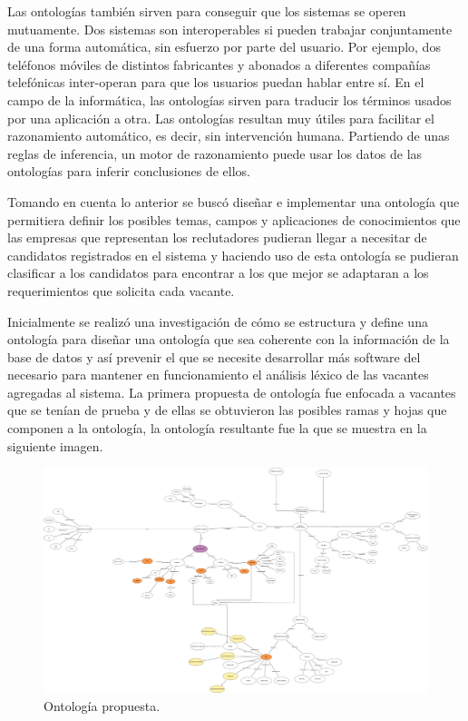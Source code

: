 Las  ontologías  también  sirven  para  conseguir  que  los sistemas se operen  mutuamente.  Dos  sistemas  son  interoperables  si  pueden  trabajar  conjuntamente  de  una  forma automática, sin esfuerzo por parte del usuario. Por ejemplo, dos teléfonos móviles de distintos fabricantes y abonados a diferentes  compañías  telefónicas  inter-operan  para  que  los usuarios   puedan   hablar   entre   sí.   En   el   campo   de   la informática, las ontologías sirven para traducir los términos usados  por  una  aplicación  a  otra. Las ontologías resultan muy útiles para facilitar el razonamiento automático, es decir, sin intervención humana. Partiendo de unas reglas  de  inferencia,  un  motor  de  razonamiento  puede  usar  los datos  de  las  ontologías  para  inferir  conclusiones  de  ellos.  \\
\newline

Tomando en cuenta lo anterior se buscó diseñar e implementar una ontología que permitiera definir los posibles temas, campos y aplicaciones de conocimientos que las empresas que representan los reclutadores pudieran llegar a necesitar de candidatos registrados en el sistema y haciendo uso de esta ontología se pudieran clasificar a los candidatos para encontrar a los que mejor se adaptaran a los requerimientos que solicita cada vacante. \\
\newline

Inicialmente se realizó una investigación de cómo se estructura y define una ontología para diseñar una ontología que sea coherente con la información de la base de datos y así prevenir el que se necesite desarrollar más software del necesario para mantener en funcionamiento el análisis léxico de las vacantes agregadas al sistema. La primera propuesta de ontología fue enfocada a vacantes que se tenían de prueba y de ellas se obtuvieron las posibles ramas y hojas que componen a la ontología, la ontología resultante fue la que se muestra en la siguiente imagen.

\begin{figure}[H]
    \begin{center}
        \includegraphics[width=.8\textwidth]{desarrollo/imagenes/Ontologia.png}
    \end{center}
    \caption{Ontología propuesta.}
    \label{mark:top}
\end{figure}
 \clearpage

